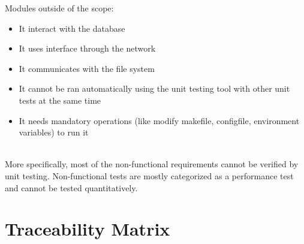 \documentclass[12pt, titlepage]{article}
\begin{document}
\newline Modules outside of the scope:
\begin{itemize}
    \item It interact with the database
    \item It uses interface through the network
    \item It communicates with the file system
    \item It cannot be ran automatically using the unit testing tool with other unit tests at the same time
    \item It needs mandatory operations (like modify makefile, configfile, environment variables) to run it
\end{itemize}\\

More specifically, most of the non-functional requirements cannot be verified by unit testing. Non-functional tests are mostly categorized as a performance test and cannot be tested quantitatively.

  

\section{Traceability Matrix}
\end{document}
